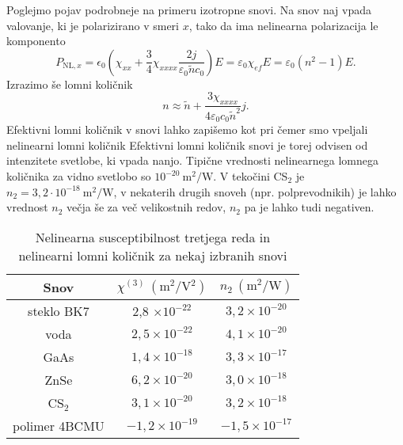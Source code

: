 Poglejmo pojav podrobneje na primeru izotropne snovi. Na snov naj vpada valovanje, ki je polarizirano
v smeri $x$, tako da ima nelinearna polarizacija le komponento 
\begin{equation}
P_{\mathrm{NL},x}=
\epsilon_{0} \left(\chi_{xx} +\frac{3}{4} \chi_{xxxx}\frac{2 j }
{\varepsilon_0 \tilde{n} c_0}\right)E = \varepsilon_0 \chi_{ef}E = \varepsilon_0 (n^2-1) E.
\end{equation}
Izrazimo še lomni količnik
\begin{equation}
n \approx \tilde{n} + \frac{3 \chi_{xxxx}}{4 \varepsilon_0 c_0 \tilde{n}^2} j.
\end{equation}
Efektivni lomni količnik v snovi lahko zapišemo kot 
pri čemer smo vpeljali nelinearni lomni količnik
Efektivni lomni količnik snovi je torej odvisen od intenzitete svetlobe, ki vpada nanjo. 
Tipične vrednosti nelinearnega lomnega količnika za vidno svetlobo so $10^{-20}~\si{\metre^2/\watt}$.
V tekočini CS$_2$ je $n_2 = 3,2 \cdot 10^{-18}~\si{\metre^2/\watt}$, v nekaterih 
drugih snoveh (npr. polprevodnikih) je lahko vrednost $n_2$ večja še za več 
velikostnih redov, $n_2$ pa je lahko tudi negativen. 

\begin{table}[h]
 \centering
\begin{tabular}{|c|c|c|} \hline  
      Snov & $\chi^{(3)}~(\si{\metre^2/\volt^2})$ & $n_2~(\si{\metre^2/\watt})$\\ \hline
     steklo BK7 & 2,8 $\times 10^{-22}$ & $3,2 \times 10^{-20}$ \\ \hline
     voda & $2,5 \times 10^{-22}$ & $4,1 \times 10^{-20}$ \\ \hline
     GaAs & $1,4 \times 10^{-18}$ & $3,3 \times 10^{-17}$ \\ \hline\index{GaAs}
     ZnSe & $6,2 \times 10^{-20}$ & $3,0 \times 10^{-18}$ \\ \hline\index{ZnSe}
     CS$_2$ & $3,1 \times 10^{-20}$ & $3,2 \times 10^{-18}$ \\ \hline \index{CS$_2$}
     polimer 4BCMU  & $-1,2 \times 10^{-19}$ & $-1,5 \times 10^{-17}$ \\ \hline      
\end{tabular}
  \caption{Nelinearna susceptibilnost tretjega reda in nelinearni lomni količnik za nekaj izbranih snovi}
\label{table:chi3}
\end{table}

